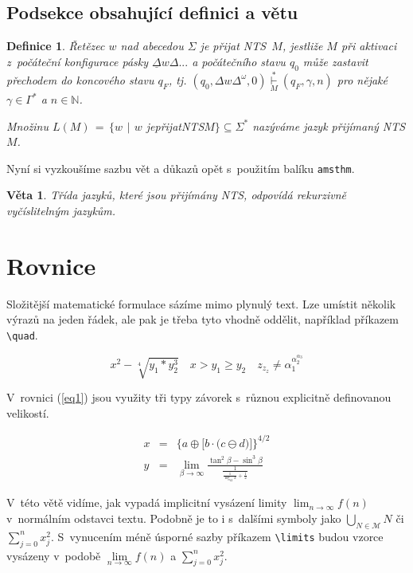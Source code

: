 \documentclass[twocolumn, 11pt, a4paper]{article}
\newtheorem{definition}{Definice}
\newtheorem{lemma}{Věta}
\begin{document}
	\subsection{Podsekce obsahující definici a větu}
		\begin{definition}
		\label{def2}
			\textnormal{Řetězec $w$ nad abecedou $\Sigma$ je přijat NTS}~$M$,
			\textit{
				jestliže $M$ při aktivaci z~počáteční konfigurace pásky
				$\underline{\Delta}w\Delta ...$ a počátečního stavu $q_0$ může zastavit přechodem do koncového stavu $q_F$, tj.
				$(q_0, \Delta w\Delta^{\omega}, 0) \overset{*}{\underset{M}{\vdash}} (q_F, \gamma, n)$
				pro nějaké
				$\gamma \in \Gamma^*$ a $n \in \mathbb{N}$.
			}
	
			\textit{Množinu} $L(M)\, =\, \{w\ \,|\ \,w$\!  je\;přijat\;NTS\;$M\} \subseteq \Sigma^*$ nazýváme \textnormal{jazyk přijímaný NTS} $M$.	
		\end{definition}
		Nyní si vyzkoušíme sazbu vět a důkazů opět s~použitím balíku \texttt{amsthm}.
		\begin{lemma}Třída jazyků, které jsou přijímány NTS, odpovídá \textnormal{rekurzivně vyčíslitelným jazykům.}
		\end{lemma}

\section{Rovnice}
	Složitější matematické formulace sázíme mimo plynulý text. Lze umístit několik výrazů na jeden řádek, ale pak je třeba tyto vhodně oddělit, například příkazem \verb|\quad|.
	
$$
		x^2 - \sqrt[4]{y_1 \ast y^3_{2}} \quad x > y_1 \geq y_2 \quad z_{z_z} \not= \alpha^{\alpha^{\alpha_3}_2}_1
$$

	V~rovnici (\ref{eq1}) jsou využity tři typy závorek s~různou explicitně definovanou velikostí.
	
	\begin{eqnarray}
		x &=& \bigg\{a \oplus \Big[b \cdot \big(c \ominus d \big)\Big] \bigg\}^{4/2} \label{eq1}\\
		y &=& \lim_{\beta\to\infty} \frac{\tan^2 \beta \minus \sin^3 \beta}{\frac{1}{\frac{1}{\log_{42}x} + \frac{1}{2}}}\label{eq2}
	\end{eqnarray}
	
	V~této větě vidíme, jak vypadá implicitní vysázení limity
	$\lim_{n\to\infty} f(n)$
	v~normálním odstavci textu. Podobně je to i s~dalšími symboly jako
	$\bigcup_{N \in \mathcal{M}} N$ či $\sum_{j=0}^n x^2_j$.
	S~vynucením méně úsporné sazby příkazem \verb|\limits| budou vzorce vysázeny v~podobě
	$\lim\limits_{n\to\infty} f(n)$ a $\sum\limits^n_{j=0} x^2_j$. 
\end{document}
